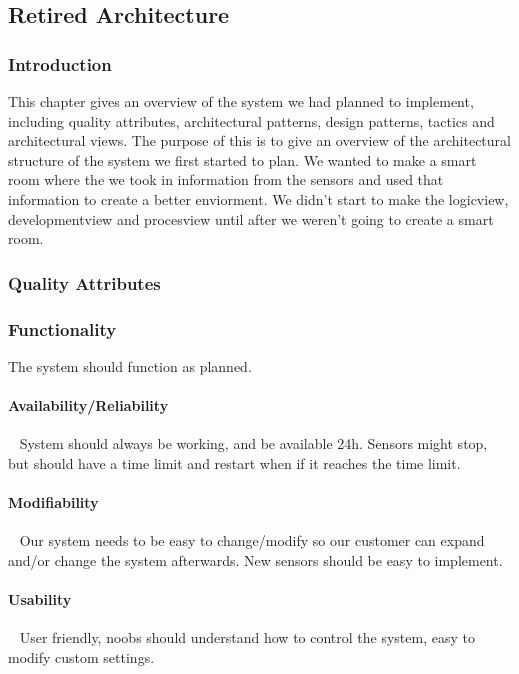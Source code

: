 \documentclass[../document]{subfiles}
\begin{document}
\subsection{Retired Architecture}
\label{retired_architecture}
\subsubsection{Introduction}
This chapter gives an overview of the system we had planned to implement, including quality attributes, architectural patterns, design patterns, tactics and architectural views. The purpose of this is to give an overview of the architectural structure of the system we first started to plan. We wanted to make a smart room where the we took in information from the sensors and used that information to create a better enviorment. We didn't start to make the logicview, developmentview and procesview until after we weren't going to create a smart room.

\subsubsection{Quality Attributes}
\subsubsection{Functionality}
The system should function as planned. 

\paragraph{Availability/Reliability} \ \newline
System should always be working, and be available 24h. Sensors might stop, but should have a time limit and restart when if it reaches the time limit. 

\paragraph{Modifiability} \ \newline
Our system needs to be easy to change/modify so our customer can expand and/or change the system afterwards. New sensors should be easy to implement.

\paragraph{Usability} \ \newline
User friendly, noobs should understand how to control the system, easy to modify custom settings.
\end{document}
